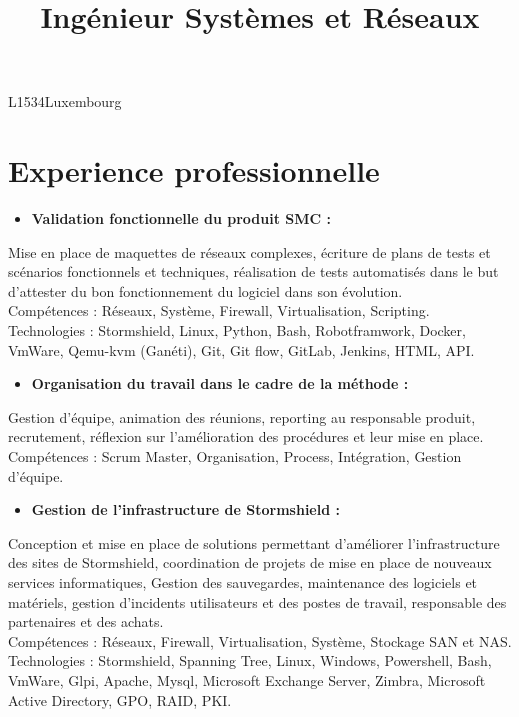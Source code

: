 

\title{Ingénieur Systèmes et Réseaux} 
\address{57, rue de la forêt}{L1534}{Luxembourg}


\makecvtitle
\section{Experience professionnelle}
		{
			\begin{itemize}
				\item \textbf{Validation fonctionnelle du produit SMC :}
			\end{itemize}
			Mise en place de maquettes de réseaux complexes, écriture de plans de tests et scénarios fonctionnels et techniques, réalisation de tests automatisés dans le but d'attester du bon fonctionnement du logiciel dans son évolution.\\
			\textcolor{myblue}{Compétences : Réseaux, Système, Firewall, Virtualisation, Scripting.}\\
            \textcolor{myblue}{Technologies : Stormshield, Linux, Python, Bash, Robotframwork, Docker, VmWare, Qemu-kvm (Ganéti), Git, Git flow, GitLab, Jenkins, HTML, API.}
			\begin{itemize}
				\item \textbf{Organisation du travail dans le cadre de la méthode :}
			\end{itemize}
			Gestion d'équipe, animation des réunions, reporting au responsable produit, recrutement, réflexion sur l'amélioration des procédures et leur mise en place.\\
			\textcolor{myblue}{Compétences : Scrum Master, Organisation, Process, Intégration, Gestion d'équipe.}\\
		}
	    {
		    \begin{itemize}
				\item \textbf{Gestion de l'infrastructure de Stormshield :}
			\end{itemize}
			Conception et mise en place de solutions permettant d'améliorer l'infrastructure des sites de Stormshield, coordination de projets de mise en place de nouveaux services informatiques, Gestion des sauvegardes, maintenance des logiciels et matériels, gestion d'incidents utilisateurs et des postes de travail, responsable des partenaires et des achats.\\
			\textcolor{myblue}{Compétences : Réseaux, Firewall, Virtualisation, Système, Stockage SAN et NAS.}\\
			\textcolor{myblue}{Technologies : Stormshield, Spanning Tree, Linux, Windows, Powershell, Bash, VmWare, Glpi, Apache, Mysql, Microsoft Exchange Server, Zimbra, Microsoft Active Directory, GPO, RAID, PKI.}\\
		} 	

